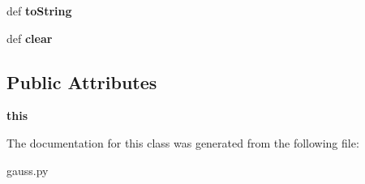 \begin{DoxyCompactItemize}
\item 
\hypertarget{classgauss_1_1_g_e_array_ae1e02400de4d8e065566649f151549ca}{def {\bfseries to\-String}}\label{classgauss_1_1_g_e_array_ae1e02400de4d8e065566649f151549ca}

\item 
\hypertarget{classgauss_1_1_g_e_array_ad06e264f8df5400119f2baff613843c9}{def {\bfseries clear}}\label{classgauss_1_1_g_e_array_ad06e264f8df5400119f2baff613843c9}

\end{DoxyCompactItemize}
\subsection*{Public Attributes}
\begin{DoxyCompactItemize}
\item 
\hypertarget{classgauss_1_1_g_e_array_a61bb4adaad9017ab0c4e7874ead4075b}{{\bfseries this}}\label{classgauss_1_1_g_e_array_a61bb4adaad9017ab0c4e7874ead4075b}

\end{DoxyCompactItemize}


The documentation for this class was generated from the following file\-:\begin{DoxyCompactItemize}
\item 
gauss.\-py\end{DoxyCompactItemize}
